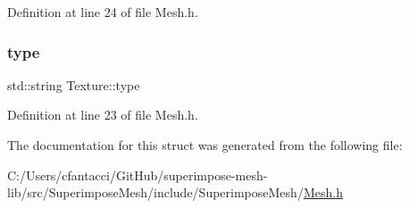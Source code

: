 Definition at line 24 of file Mesh.\+h.

\mbox{\label{structTexture_a916a835d009806f2a57546c7705942b1}} 
\subsubsection{\texorpdfstring{type}{type}}
{\footnotesize\ttfamily std\+::string Texture\+::type}



Definition at line 23 of file Mesh.\+h.



The documentation for this struct was generated from the following file\+:\begin{DoxyCompactItemize}
\item 
C\+:/\+Users/cfantacci/\+Git\+Hub/superimpose-\/mesh-\/lib/src/\+Superimpose\+Mesh/include/\+Superimpose\+Mesh/\mbox{\hyperlink{Mesh_8h}{Mesh.\+h}}\end{DoxyCompactItemize}
